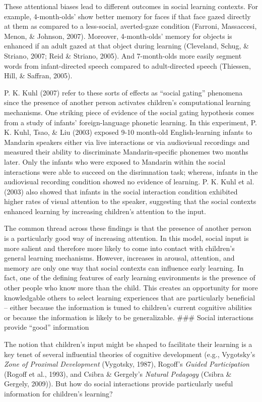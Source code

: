 \documentclass[a4paper,man,apacite,floatsintext]{apa6}
\begin{document}
These attentional biases lead to different outcomes in social learning
contexts. For example, 4-month-olds' show better memory for faces if
that face gazed directly at them as compared to a less-social,
averted-gaze condition (Farroni, Massaccesi, Menon, \& Johnson, 2007).
Moreover, 4-month-olds' memory for objects is enhanced if an adult gazed
at that object during learning (Cleveland, Schug, \& Striano, 2007; Reid
\& Striano, 2005). And 7-month-olds more easily segment words from
infant-directed speech compared to adult-directed speech (Thiessen,
Hill, \& Saffran, 2005).

P. K. Kuhl (2007) refer to these sorts of effects as ``social gating''
phenomena since the presence of another person activates children's
computational learning mechanisms. One striking piece of evidence of the
social gating hypothesis comes from a study of infants' foreign-language
phonetic learning. In this experiment, P. K. Kuhl, Tsao, \& Liu (2003)
exposed 9-10 month-old English-learning infants to Mandarin speakers
either via live interactions or via audiovisual recordings and measured
their ability to discriminate Mandarin-specific phonemes two months
later. Only the infants who were exposed to Mandarin within the social
interactions were able to succeed on the disrimnation task; whereas,
infants in the audiovisual recording condition showed no evidence of
learning. P. K. Kuhl et al. (2003) also showed that infants in the
social interaction condition exhibited higher rates of visual attention
to the speaker, suggesting that the social contexts enhanced learning by
increasing children's attention to the input.

The common thread across these findings is that the presence of another
person is a particularly good way of increasing attention. In this
model, social input is more salient and therefore more likely to come
into contact with children's general learning mechanisms. However,
increases in arousal, attention, and memory are only one way that social
contexts can influence early learning. In fact, one of the defining
features of early learning environments is the presence of other people
who know more than the child. This creates an opportunity for more
knowledgable others to select learning experiences that are particularly
beneficial -- either because the information is tuned to children's
current cognitive abilities or because the information is likely to be
generalizable. \#\#\# Social interactions provide ``good'' information

The notion that children's input might be shaped to facilitate their
learning is a key tenet of several influential theories of cognitive
development (e.g., Vygotsky's \emph{Zone of Proximal Development}
(Vygotsky, 1987), Rogoff's \emph{Guided Participation} (Rogoff et al.,
1993), and Csibra \& Gergely's \emph{Natural Pedagogy} (Csibra \&
Gergely, 2009)). But how do social interactions provide particularly
useful information for children's learning?
\end{document}
